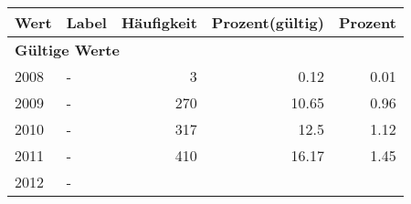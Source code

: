      \begin{longtable}{lXrrr}
     \toprule
     \textbf{Wert} & \textbf{Label} & \textbf{Häufigkeit} & \textbf{Prozent(gültig)} & \textbf{Prozent} \\
     \endhead
     \midrule
     \multicolumn{5}{l}{\textbf{Gültige Werte}}\\

     2008 &
     \multicolumn{1}{X}{ -  } &


       \num{3} &
       \num[round-mode=places,round-precision=2]{0.12} &
         \num[round-mode=places,round-precision=2]{0.01} \\

     2009 &
     \multicolumn{1}{X}{ -  } &


       \num{270} &
       \num[round-mode=places,round-precision=2]{10.65} &
         \num[round-mode=places,round-precision=2]{0.96} \\

     2010 &
     \multicolumn{1}{X}{ -  } &


       \num{317} &
       \num[round-mode=places,round-precision=2]{12.5} &
         \num[round-mode=places,round-precision=2]{1.12} \\

     2011 &
     \multicolumn{1}{X}{ -  } &


       \num{410} &
       \num[round-mode=places,round-precision=2]{16.17} &
         \num[round-mode=places,round-precision=2]{1.45} \\

     2012 &
     \multicolumn{1}{X}{ -  } &



\end{longtable}
